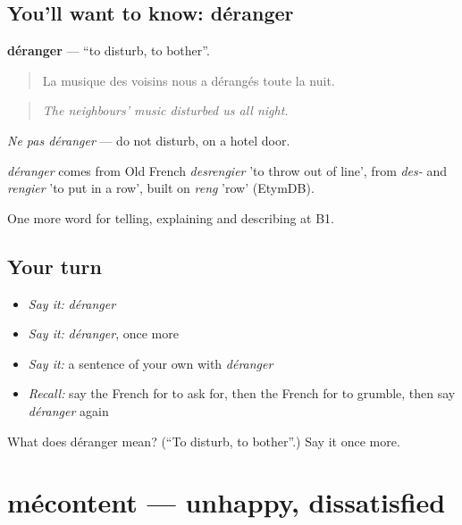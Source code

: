 \subsection*{You'll want to know: déranger}
\textbf{déranger} — \textquotedblleft{}to disturb, to bother\textquotedblright{}.

\begin{quote}
La musique des voisins nous a dérangés toute la nuit.
\end{quote}

\begin{quote}
\emph{The neighbours' music disturbed us all night.}
\end{quote}

\emph{Ne pas déranger} — do not disturb, on a hotel door.

\begin{cousinweb}
\emph{déranger} comes from Old French \emph{desrengier} 'to throw out of line', from \emph{des-} and \emph{rengier} 'to put in a row', built on \emph{reng} 'row' (EtymDB).
\end{cousinweb}

\begin{grammarlens}[title={What you've built}]
One more word for telling, explaining and describing at B1.
\end{grammarlens}

\subsection*{Your turn}
\begin{itemize}
\raggedright
  \item \emph{Say it:} \emph{déranger}
  \item \emph{Say it:} \emph{déranger}, once more
  \item \emph{Say it:} a sentence of your own with \emph{déranger}
  \item \emph{Recall:} say the French for to ask for, then the French for to grumble, then say \emph{déranger} again
\end{itemize}

\begin{tcolorbox}[breakable,colback=teal!4,colframe=teal!35!black,title={Before you move on}]
What does déranger mean? (\textquotedblleft{}To disturb, to bother\textquotedblright{}.) Say it once more.
\end{tcolorbox}
\section[mécontent]{mécontent — unhappy, dissatisfied}

